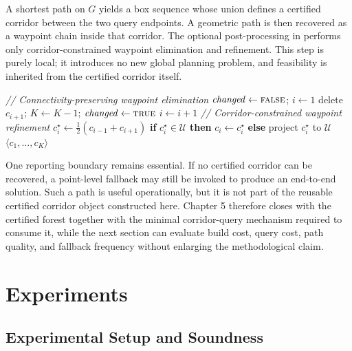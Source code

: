 \documentclass[journal]{IEEEtran}
\begin{document}
A shortest path on $G$ yields a box sequence whose union defines a certified
corridor between the two query endpoints. A geometric path is then recovered as
a waypoint chain inside that corridor. The optional post-processing in
 performs only corridor-constrained waypoint
elimination and refinement. This step is purely local; it introduces no new
global planning problem, and feasibility is inherited from the certified
corridor itself.

\begin{algorithm}[t]
\caption{Lightweight corridor cleanup (\textsc{PathOpt})}
\label{alg:pathopt_rewrite}
\footnotesize
\begin{algorithmic}[1]
\STATE \textit{// Connectivity-preserving waypoint elimination}
\REPEAT
  \STATE $\mathit{changed} \gets \textsc{false}$; $i \gets 1$
      \STATE delete $c_{i+1}$; $K \gets K-1$; $\mathit{changed} \gets \textsc{true}$
    \ELSE
      \STATE $i \gets i+1$
    \ENDIF
  \ENDWHILE
{}
\STATE \textit{// Corridor-constrained waypoint refinement}
  \STATE $c_i^\star \gets \tfrac{1}{2}(c_{i-1}+c_{i+1})$
  \STATE \textbf{if} $c_i^\star \in \mathcal{U}$ \textbf{then} $c_i \gets c_i^\star$
  \STATE \textbf{else} project $c_i^\star$ to $\mathcal{U}$
\ENDFOR
\STATE \RETURN $\langle c_1,\dots,c_K\rangle$
\end{algorithmic}
\end{algorithm}

One reporting boundary remains essential. If no certified corridor can be
recovered, a point-level fallback may still be invoked to produce an end-to-end
solution. Such a path is useful operationally, but it is not part of the
reusable certified corridor object constructed here. Chapter 5 therefore closes
with the certified forest together with the minimal corridor-query mechanism
required to consume it, while the next section can evaluate build cost, query
cost, path quality, and fallback frequency without enlarging the
methodological claim.

\section{Experiments}\label{sec:exp}

\subsection{Experimental Setup and Soundness}\label{sec:exp_setup_sound}
\end{document}
